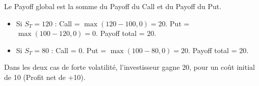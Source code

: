 \begin{correctionbox}
Le Payoff global est la somme du Payoff du Call et du Payoff du Put.
\begin{itemize}[label=$\cdot$]
    \item Si $S_T = 120$ : Call = $\max(120 - 100, 0) = 20$. Put = $\max(100 - 120, 0) = 0$. Payoff total = $20$.
    \item Si $S_T = 80$ : Call = $0$. Put = $\max(100 - 80, 0) = 20$. Payoff total = $20$.
\end{itemize}
Dans les deux cas de forte volatilité, l'investisseur gagne 20, pour un coût initial de 10 (Profit net de +10).
\end{correctionbox}